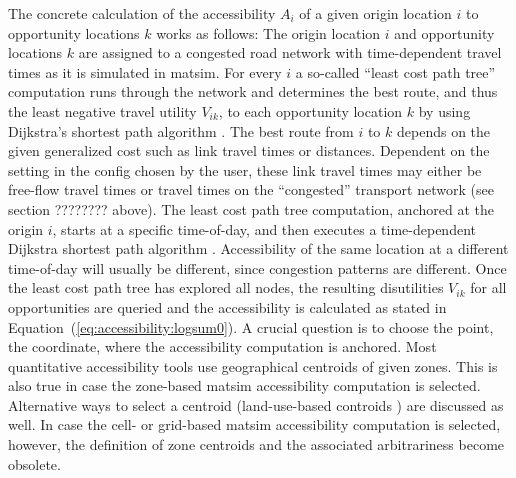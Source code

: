 The concrete calculation of the accessibility $A_i$ of a given origin location $i$ to opportunity locations $k$ works as 
follows: The origin location $i$ and opportunity locations $k$ are assigned to a congested road network with time-dependent 
travel times as it is simulated in \gls{matsim}. For every $i$ a so-called ``least cost path tree'' computation runs through the 
network and determines the best route, and thus the least negative travel utility $V_{ik}$, to each opportunity location 
$k$ by using Dijkstra's shortest path algorithm \citep{Dijkstra1959ShortestPath}. The best route from $i$ to $k$ depends 
on the given generalized cost such as link travel times or distances. 
%
Dependent on the setting in the config chosen by the user, these link travel times may either be free-flow travel times or
travel times on the ``congested'' transport network (see section ???????? above). The least cost path tree computation, 
anchored at the origin $i$, starts at a specific time-of-day, and then executes a time-dependent Dijkstra shortest path 
algorithm \citep{LefebvreBalmer2007Fastshortestpath}. Accessibility of the same location at a different time-of-day will 
usually be different, since congestion patterns are different.
%
Once the least cost path tree has explored all 
nodes, the resulting disutilities $V_{ik}$ for all opportunities are queried and the accessibility is calculated as 
stated in Equation~(\ref{eq:accessibility:logsum0}).
%
A crucial question is to choose the point, \ie the coordinate, where the accessibility computation is anchored. Most
quantitative accessibility tools use geographical centroids of given zones. This is also true in case the zone-based 
\gls{matsim} accessibility computation is selected. Alternative ways to select a centroid (\eg land-use-based
controids \citep{BuettnerEtAl2010Erreichbarkeitsatlas}) are discussed as well. In case the cell- or grid-based 
\gls{matsim} accessibility computation is selected, however, the definition of zone centroids and the associated arbitrariness
become obsolete.


